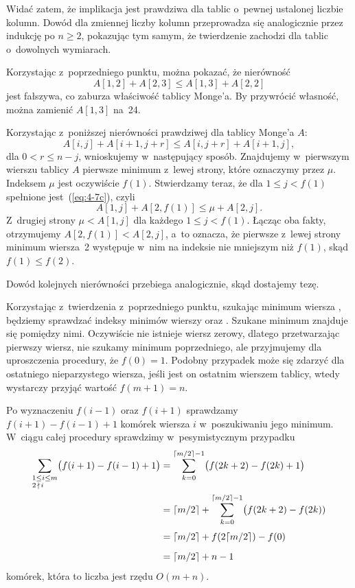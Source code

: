 Widać zatem, że implikacja jest prawdziwa dla tablic o~pewnej ustalonej liczbie kolumn. Dowód dla zmiennej liczby kolumn przeprowadza się analogicznie przez indukcję po $n\ge2$, pokazując tym samym, że twierdzenie zachodzi dla tablic o~dowolnych wymiarach.

\subproblem %
Korzystając z~poprzedniego punktu, można pokazać, że nierówność
\[
	A[1,2]+A[2,3] \le A[1,3]+A[2,2]
\]
jest fałszywa, co zaburza właściwość tablicy Monge'a. By przywrócić własność, można zamienić $A[1,3]$ na~24.

\subproblem %
Korzystając z~poniższej nierówności prawdziwej dla tablicy Monge'a $A$:
\[
	A[i,j]+A[i+1,j+r] \le A[i,j+r]+A[i+1,j], \tag{$*$}\label{eq:4-7c}
\]
dla $0<r\le n-j$, wnioskujemy w~następujący sposób. Znajdujemy w~pierwszym wierszu tablicy $A$ pierwsze minimum z~lewej strony, które oznaczymy przez $\mu$. Indeksem $\mu$ jest oczywiście $f(1)$. Stwierdzamy teraz, że dla $1\le j<f(1)$ spełnione jest~(\ref{eq:4-7c}), czyli
\[
	A[1,j]+A[2,f(1)] \le \mu+A[2,j].
\]
Z~drugiej strony $\mu<A[1,j]$ dla każdego $1\le j<f(1)$. Łącząc oba fakty, otrzymujemy $A[2,f(1)]<A[2,j]$, a~to oznacza, że pierwsze z~lewej strony minimum wiersza~2 występuje w~nim na indeksie nie mniejszym niż $f(1)$, skąd $f(1)\le f(2)$.

Dowód kolejnych nierówności przebiega analogicznie, skąd dostajemy tezę.

\subproblem %
Korzystając z~twierdzenia z~poprzedniego punktu, szukając minimum wiersza , będziemy sprawdzać indeksy minimów wierszy  oraz . Szukane minimum znajduje się pomiędzy nimi. Oczywiście nie istnieje wiersz zerowy, dlatego przetwarzając pierwszy wiersz, nie szukamy minimum poprzedniego, ale przyjmujemy dla uproszczenia procedury, że $f(0)=1$. Podobny przypadek może się zdarzyć dla ostatniego nieparzystego wiersza, jeśli jest on ostatnim wierszem tablicy, wtedy wystarczy przyjąć wartość $f(m+1)=n$.

Po wyznaczeniu $f(i-1)$ oraz $f(i+1)$ sprawdzamy $f(i+1)-f(i-1)+1$ komórek wiersza $i$ w~poszukiwaniu jego minimum. W~ciągu całej procedury sprawdzimy w~pesymistycznym przypadku
\begin{align*}
	\sum_{\begin{subarray}{l}1\le i\le m\\2\,\nmid\,i\end{subarray}}\bigl(f(i+1)-f(i-1)+1\bigr) &= \sum_{k=0}^{\lceil m/2\rceil-1}\bigl(f(2k+2)-f(2k)+1\bigr) \\
	&= \lceil m/2\rceil+\sum_{k=0}^{\lceil m/2\rceil-1}\bigl(f(2k+2)-f(2k)) \\[1mm]
	&= \lceil m/2\rceil+f(2\lceil m/2\rceil)-f(0) \\[2mm]
	&= \lceil m/2\rceil+n-1
\end{align*}
komórek, która to liczba jest rzędu $O(m+n)$.

